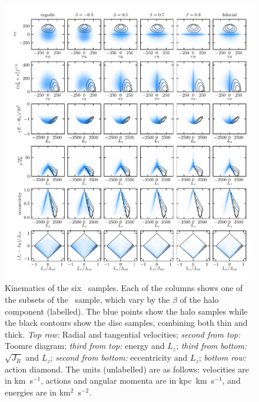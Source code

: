 \begin{figure}
	\centering
	\includegraphics[width=\textwidth]{figure/ch2/SolarKinematicsGrid.pdf}
	\caption{Kinematics of the six \solar\ samples. Each of the columns shows one of the subsets of the \solar\ sample, which vary by the $\beta$ of the halo component (labelled). The blue points show the halo samples while the black contours show the disc samples, combining both thin and thick. \textit{Top row:} Radial and tangential velocities; \textit{second from top:} Toomre diagram; \textit{third from top:} energy and $L_{z}$; \textit{third from bottom:} $\sqrt{J_{R}}$ and $L_{z}$; \textit{second from bottom:} eccentricity and $L_{z}$; \textit{bottom row:} action diamond. The units (unlabelled) are as follows: velocities are in km~s$^{-1}$, actions and angular momenta are in kpc~km~s$^{-1}$, and energies are in km$^{2}$~s$^{-2}$.} \label{ch2:fig:SolarKinematics}
\end{figure}

